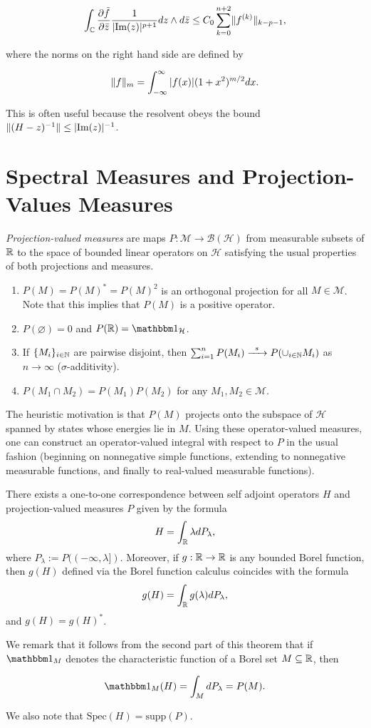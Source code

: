 \documentclass[12pt, letterpaper]{article}
\begin{document}
\[\int_{\mathbb{C}}\frac{\partial \tilde{f}}{\partial \bar{z}} \frac{1}{|\text{Im}(z)|^{p+1}}dz\wedge d\bar{z} \leq C_0 \sum_{k=0}^{n+2 }\lVert f^{(k)} \rVert_{k-p-1},\]

where the norms on the right hand side are defined by 

\[\lVert f \rVert_{m} = \int_{-\infty}^\infty |f(x)|(1+x^2)^{m/2}dx.\]

This is often useful because the resolvent obeys the bound $\lVert (H-z)^{-1} \rVert \leq |\text{Im}(z)|^{-1}$.

\section{Spectral Measures and Projection-Values Measures}\label{sec:pvm}

\emph{Projection-valued measures} are maps $P:\mathcal{M}\to\mathcal{B}(\mathcal{H})$ from measurable subsets of $\mathbb{R}$ to the space of bounded linear operators on $\mathcal{H}$ satisfying the usual properties of both projections and measures.

\begin{enumerate}
\item $P(M)=P(M)^*=P(M)^2$ is an orthogonal projection for all $M\in\mathcal{M}$. Note that this implies that $P(M)$ is a positive operator.
\item $P(\varnothing)=0$ and $P(\R)=\One_\mathcal{H}$.
\item If $\{M_i\}_{i\in\mathbb{N}}$ are pairwise disjoint, then $\sum_{i=1}^n P(M_i) \xrightarrow{\enskip s \enskip}P(\cup_{i\in\mathbb{N}} M_i)$ as $n\to\infty$ ($\sigma$-additivity).
\item $P(M_1\cap M_2) = P(M_1)P(M_2)$ for any $M_1,M_2\in\mathcal{M}$.
\end{enumerate}

The heuristic motivation is that $P(M)$ projects onto the subspace of $\mathcal{H}$ spanned by states whose energies lie in $M$. Using these operator-valued measures, one can construct an operator-valued integral with respect to $P$ in the usual fashion (beginning on nonnegative simple functions, extending to nonnegative measurable functions, and finally to real-valued measurable functions). 

\begin{theorem}
There exists a one-to-one correspondence between self adjoint operators $H$ and projection-valued measures $P$ given by the formula
\[H = \int_{\mathbb{R}} \lambda dP_\lambda,\]
where $P_\lambda := P((-\infty,\lambda])$. Moreover, if $g:\mathbb{R}\to\mathbb{R}$ is any bounded Borel function, then $g(H)$ defined via the Borel function calculus coincides with the formula
\[g(H) = \int_{\mathbb{R}} g(\lambda) dP_\lambda,\]
and $g(H) = g(H)^*$.
\end{theorem}

We remark that it follows from the second part of this theorem that if $\One_{M}$ denotes the characteristic function of a Borel set $M\subseteq \mathbb{R}$, then 

\[\One_M(H) = \int_M dP_\lambda = P(M).\]

We also note that $\text{Spec}(H) = \text{supp}(P)$.
\end{document}
